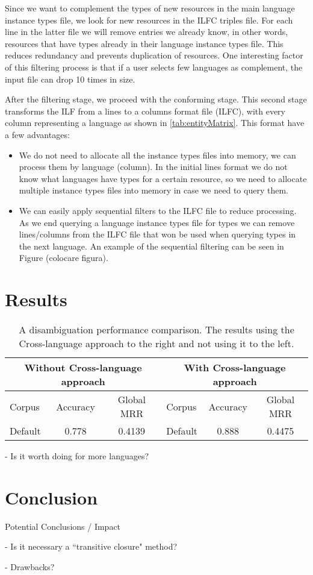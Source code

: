 \documentclass[10pt,a4paper]{llncs}
\begin{document}
Since we want to complement the types of new resources in the main language instance types file, we look for new resources in the ILFC triples file. For each line in the latter file we will remove entries we already know, in other words, resources that have types already in their language instance types file. This reduces redundancy and prevents duplication of resources. One interesting factor of this filtering process is that if a user selects few languages as complement, the input file can drop 10 times in size.

After the filtering stage, we proceed with the conforming stage. This second stage transforms the ILF from a lines to a columns format file (ILFC), with every column representing a language as shown in \ref{tab:entityMatrix}. This format have a few advantages:

\begin{itemize}
	\item We do not need to allocate all the instance types files into memory, we can process them by language (column). In the initial lines format we do not know what languages have types for a certain resource, so we need to allocate multiple instance types files into memory in case we need to query them.
	\item We can easily apply sequential filters to the ILFC file to reduce processing. As we end querying a language instance types file for types we can remove lines/columns from the ILFC file that won be used when querying types in the next language. An example of the sequential filtering can be seen in Figure (colocare figura).
\end{itemize}

\section{Results}

\begin{table}
\centering
    \begin{tabular}{|l|c|c|l|c|c|}
		\hline
		\multicolumn{3}{|c|}{Without Cross-language approach} & \multicolumn{3}{|c|}{With Cross-language approach}   \\ \hline		
    Corpus       & Accuracy     & Global MRR & Corpus       & Accuracy     & Global MRR                \\ \hline
    Default      & 0.778        & 0.4139     & Default      & 0.888        & 0.4475                    \\		
		\hline   		
    \end{tabular}
		\vspace{0.2cm}
    \caption{A disambiguation performance comparison. The results using the Cross-language approach to the right and not using it to the left.}
	  \label{tab:resultsTable}
\end{table}

- Is it worth doing for more languages?

\section{Conclusion}

Potential Conclusions / Impact

- Is it necessary a ``transitive closure" method?

- Drawbacks?




\end{document}
